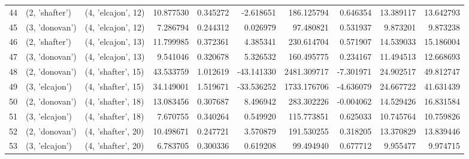 \begin{tabular}{lllrrrrrrr}
44 &   (2, 'shafter') &  (4, 'elcajon', 12) &  10.877530 &  0.345272 &  -2.618651 &   186.125794 &  0.646354 &  13.389117 &  13.642793 \\
45 &   (3, 'donovan') &  (4, 'elcajon', 12) &   7.286794 &  0.244312 &   0.026979 &    97.480821 &  0.531937 &   9.873201 &   9.873238 \\
46 &   (2, 'shafter') &  (4, 'elcajon', 13) &  11.799985 &  0.372361 &   4.385341 &   230.614704 &  0.571907 &  14.539033 &  15.186004 \\
47 &   (3, 'donovan') &  (4, 'elcajon', 13) &   9.541046 &  0.320678 &   5.326532 &   160.495775 &  0.234167 &  11.494513 &  12.668693 \\
48 &   (2, 'donovan') &  (4, 'shafter', 15) &  43.533759 &  1.012619 & -43.141330 &  2481.309717 & -7.301971 &  24.902517 &  49.812747 \\
49 &   (3, 'elcajon') &  (4, 'shafter', 15) &  34.149001 &  1.519671 & -33.536252 &  1733.176706 & -4.636079 &  24.667722 &  41.631439 \\
50 &   (2, 'donovan') &  (4, 'shafter', 18) &  13.083456 &  0.307687 &   8.496942 &   283.302226 & -0.004062 &  14.529426 &  16.831584 \\
51 &   (3, 'elcajon') &  (4, 'shafter', 18) &   7.670755 &  0.340264 &   0.549920 &   115.773851 &  0.625033 &  10.745764 &  10.759826 \\
52 &   (2, 'donovan') &  (4, 'shafter', 20) &  10.498671 &  0.247721 &   3.570879 &   191.530255 &  0.318205 &  13.370829 &  13.839446 \\
53 &   (3, 'elcajon') &  (4, 'shafter', 20) &   6.783705 &  0.300336 &   0.619208 &    99.494940 &  0.677712 &   9.955477 &   9.974715 \\
\bottomrule
\end{tabular}

